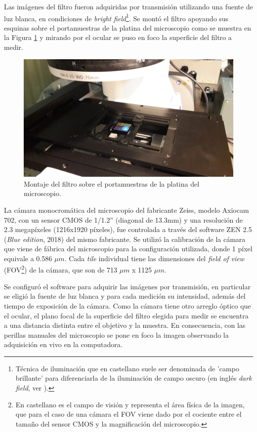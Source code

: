 Las imágenes del filtro fueron adquiridas por transmisión utilizando una fuente de luz blanca, en condiciones de \textit{bright field}\footnote{Técnica de iluminación que en castellano suele ser denominada de 'campo brillante' para diferenciarla de la iluminación de campo oscuro (en inglés \textit{dark field}, ver \href{https://es.wikipedia.org/wiki/Microscopio_de_campo_oscuro}{\faWikipediaW}).}. Se montó el filtro apoyando sus esquinas sobre el portamuestras de la platina del microscopio como se muestra en la Figura \ref{fig:filtroenZEISS} y mirando por el ocular se puso en foco la superficie del filtro a medir.  
\begin{figure}[H]
	\centering
	\includegraphics[scale=0.1]{Figs/defectosZEISS/a.jpg}
	\caption{Montaje del filtro sobre el portamuestras de la platina del microscopio.}
	\label{fig:filtroenZEISS}
\end{figure}
La cámara monocromática del microscopio del fabricante Zeiss, modelo Axiocam 702, con un sensor CMOS de 1/1.2'' (diagonal de 13.3mm) y una resolución de 2.3 megapíxeles (1216x1920 píxeles), fue controlada a través del software ZEN 2.5 (\textit{Blue edition}, 2018) del mismo fabricante. Se utilizó la calibración de la cámara que viene de fábrica del microscopio para la configuración utilizada, donde 1 píxel equivale a 0.586 $\mu m$.  Cada \textit{tile} individual tiene las dimensiones del \textit{field of view} (FOV\footnote{En castellano es el campo de visión y representa el área física de la imagen, que para el caso de una cámara el FOV viene dado por el cociente entre el tamaño del sensor CMOS y la magnificación del microscopio.}) de la cámara, que son de 713 $\mu m$ x 1125 $\mu m$. 

Se configuró el software para adquirir las imágenes por transmisión, en particular se eligió la fuente de luz blanca y para cada medición su intensidad, además del tiempo de exposición de la cámara. Como la cámara tiene otro arreglo óptico que el ocular, el plano focal de la superficie del filtro elegida para medir se encuentra a una distancia distinta entre el objetivo y la muestra. En consecuencia, con las perillas manuales del microscopio se pone en foco la imagen observando la adquisición en vivo en la computadora. 

